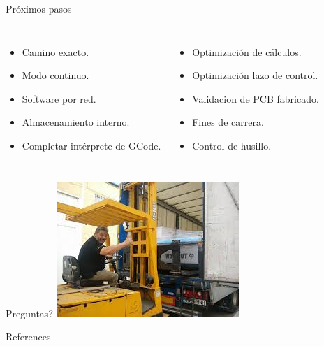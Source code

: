 \documentclass[aspectratio= 43]{beamer}
\begin{document}
\begin{frame}{Próximos pasos}
   \begin{columns}
      \begin{itemize}
         \item{Camino exacto.}
         \item{Modo continuo.}
         \item{Software por red.}
         \item{Almacenamiento interno.}
         \item{Completar intérprete de GCode.}
      \end{itemize}
      \begin{itemize}
         \item{Optimización de cálculos.}
         \item{Optimización lazo de control.}
         \item{Validacion de PCB fabricado.}
         \item{Fines de carrera.}
         \item{Control de husillo.}
      \end{itemize}
   \end{columns}
\end{frame}
%
\begin{frame}{Preguntas?}
      \includegraphics[width=\textwidth]{./Figures/sanchez.jpg}
\end{frame}


\appendix
%
\begin{frame}{References}
   \nocite{*} %
   
   
\end{frame}
\end{document}
